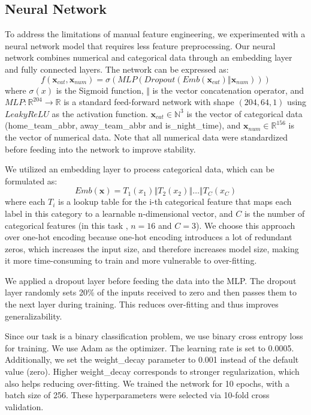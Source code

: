 \documentclass[12pt,a4paper]{article}
\begin{document}

\subsection{Neural Network}
To address the limitations of manual feature engineering, we experimented with a neural network model that requires less feature preprocessing. Our neural network combines numerical and categorical data through an embedding layer and fully connected layers. The network can be expressed as:
\[
f(\mathbf{x}_{cat}, \mathbf{x}_{num}) = \sigma(MLP(Dropout(Emb(\mathbf{x}_{cat})\mathbin\Vert \mathbf{x}_{num})))
\]
where \(\sigma(x)\) is the Sigmoid function, \(\mathbin\Vert\) is the vector concatenation operator, and \(MLP:\mathbb{R}^{204}\xrightarrow{}\mathbb{R}\) is a standard feed-forward network with shape \((204, 64, 1)\) using \(LeakyReLU\) as the activation function. \(\mathbf{x}_{cat}\in\mathbb{N}^3\) is the vector of categorical data (home\_team\_abbr, away\_team\_abbr and is\_night\_time), and \(\mathbf{x}_{num}\in\mathbb{R}^{156}\) is the vector of numerical data. Note that all numerical data were standardized before feeding into the network to improve stability.

We utilized an embedding layer to process categorical data, which can be formulated as:
\[
Emb(\mathbf{x})=T_1(x_1)\mathbin\Vert T_2(x_2)\mathbin\Vert\dots\mathbin\Vert T_C(x_C)
\]
where each \(T_i\) is a lookup table for the i-th categorical feature that maps each label in this category to a learnable n-dimensional vector, and \(C\) is the number of categorical features (in this task , \(n=16\) and \(C=3\)). We choose this approach over one-hot encoding because one-hot encoding introduces a lot of redundant zeros, which increases the input size, and therefore increases model size, making it more time-consuming to train and more vulnerable to over-fitting.

We applied a dropout layer before feeding the data into the MLP. The dropout layer randomly sets 20\% of the inputs received to zero and then passes them to the next layer during training. This reduces over-fitting and thus improves generalizability.

Since our task is a binary classification problem, we use binary cross entropy loss for training. We use Adam as the optimizer. The learning rate is set to 0.0005. Additionally, we set the weight\_decay parameter to 0.001 instead of the default value (zero). Higher weight\_decay corresponds to stronger regularization, which also helps reducing over-fitting. We trained the network for 10 epochs, with a batch size of 256. These hyperparameters were selected via 10-fold cross validation. 
\end{document}

